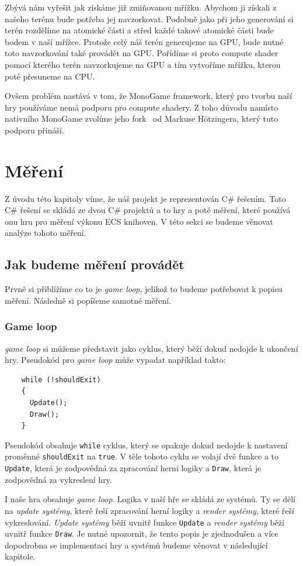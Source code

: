 Zbývá nám vyřešit jak získáme již zmiňovanou mřížku. Abychom ji získali z našeho terénu bude potřeba jej navzorkovat. Podobně jako při jeho generování si terén rozdělíme na atomické části a střed každé takové atomické části bude bodem v naší mřížce. Protože celý náš terén generujeme na GPU, bude nutné toto navzorkování také provádět na GPU. Pořídíme si proto compute shader pomocí kterého terén navzorkujeme na GPU a tím vytvoříme mřížku, kterou poté přesuneme na CPU.

Ovšem problém nastává v tom, že MonoGame framework, který pro tvorbu naší hry používáme nemá podporu pro compute shadery. Z toho důvodu namísto nativního MonoGame zvolíme jeho fork~\cite{MonoGameCptMax} od Markuse Hötzingera, který tuto podporu přináší.

\section{Měření}
Z úvodu této kapitoly víme, že náš projekt je reprezentován C\# řešením. Toto C\# řešení se skládá ze dvou C\# projektů a to hry a poté měření, které používá onu hru pro měření výkonu ECS knihoven. V této sekci se budeme věnovat analýze tohoto měření.

\subsection{Jak budeme měření provádět}
Prvně si přiblížíme co to je \textit{game loop}, jelikož to budeme potřebovat k popisu měření. Následně si popíšeme samotné měření.

\subsubsection{Game loop}
\textit{game loop} si můžeme představit jako cyklus, který běží dokud nedojde k ukončení hry. Pseudokód pro \textit{game loop} může vypadat například takto:

\begin{verbatim}
    while (!shouldExit) 
    {
      Update();
      Draw();
    }
\end{verbatim}

Pseudokód obsahuje \texttt{while} cyklus, který se opakuje dokud nedojde k nastavení proměnné \texttt{shouldExit} na \texttt{true}. V těle tohoto cyklu se volají dvě funkce a to \texttt{Update}, která je zodpovědná za zpracování herní logiky a \texttt{Draw}, která je zodpovědná za vykreslení hry. 

I naše hra obsahuje \textit{game loop}. Logika v naší hře se skládá ze systémů. Ty se dělí na \textit{update systémy}, které řeší zpracování herní logiky a \textit{render systémy}, které řeší vykreslování. \textit{Update systémy} běží uvnitř funkce \texttt{Update} a \textit{render systémy} běží uvnitř funkce \texttt{Draw}. Je nutné upozornit, že tento popis je zjednodušen a více dopodrobna se implementaci hry a systémů budeme věnovat v následující kapitole.

